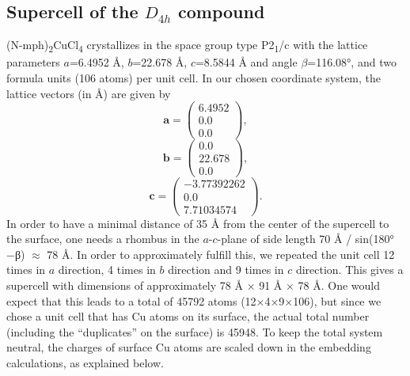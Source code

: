 \subsection{Supercell of the $D_{4h}$ compound}
(N-mph)\textsubscript{2}CuCl\textsubscript{4} crystallizes in the space group type P2\textsubscript{1}/c with the lattice parameters $a$=6.4952 Å, $b$=22.678 Å, $c$=8.5844 Å and angle $\beta$=116.08°, and two formula units (106 atoms) per unit cell. In our chosen coordinate system, the lattice vectors (in Å) are given by
	\begin{equation}
	{\mathbf{a}} = \left( {\begin{array}{*{20}{c}}
  {6.4952} \\ 
  {0.0} \\ 
  {0.0} 
\end{array}} \right),
\end{equation}
	\begin{equation}
	{\mathbf{b}} = \left( {\begin{array}{*{20}{c}}
  {0.0} \\ 
  {22.678} \\ 
  {0.0} 
\end{array}} \right),
\end{equation}
	\begin{equation}
	{\mathbf{c}} = \left( {\begin{array}{*{20}{c}}
  { - 3.77392262} \\ 
  {0.0} \\ 
  {7.71034574} 
\end{array}} \right).
\end{equation}
In order to have a minimal distance of 35 Å from the center of the supercell to the surface, one needs a rhombus in the $a$-$c$-plane of side length 70 Å / sin(180°−β) $\approx$ 78 Å. In order to approximately fulfill this, we repeated the unit cell 12 times in $a$ direction, 4 times in $b$ direction and 9 times in $c$ direction. This gives a supercell with dimensions of approximately 78 Å × 91 Å × 78 Å. One would expect that this leads to a total of 45792 atoms (12×4×9×106), but since we chose a unit cell that has Cu atoms on its surface, the actual total number (including the “duplicates” on the surface) is 45948. To keep the total system neutral, the charges of surface Cu atoms are scaled down in the embedding calculations, as explained below.

